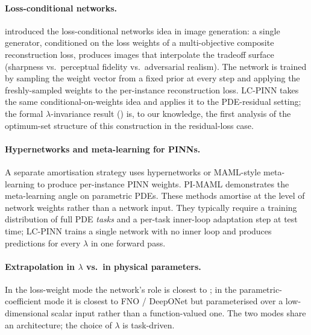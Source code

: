\paragraph{Loss-conditional networks.}
\citet{dosovitskiy2020} introduced the loss-conditional networks idea
in image generation: a single generator, conditioned on the loss
weights of a multi-objective composite reconstruction loss, produces
images that interpolate the tradeoff surface (sharpness vs.\ perceptual
fidelity vs.\ adversarial realism). The network is trained by sampling
the weight vector from a fixed prior at every step and applying the
freshly-sampled weights to the per-instance reconstruction loss.
LC-PINN takes the same conditional-on-weights idea and applies it to
the PDE-residual setting; the formal $\lambda$-invariance result
() is, to our knowledge, the first analysis of the
optimum-set structure of this construction in the residual-loss
case.

\paragraph{Hypernetworks and meta-learning for PINNs.}
A separate amortisation strategy uses hypernetworks
\citep{ha2017hypernetworks} or MAML-style meta-learning
\citep{finn2017maml} to produce per-instance PINN weights. PI-MAML
\citep{liu2022pi-maml} demonstrates the meta-learning angle on
parametric PDEs. These methods amortise at the level of network
weights rather than a network input. They typically require a training
distribution of full PDE \emph{tasks} and a per-task inner-loop
adaptation step at test time; LC-PINN trains a single network with no
inner loop and produces predictions for every $\lambda$ in one forward
pass.

\paragraph{Extrapolation in $\lambda$ vs.\ in physical parameters.}
In the loss-weight mode the network's role is closest to
\citet{dosovitskiy2020}; in the parametric-coefficient mode it is
closest to FNO / DeepONet but parameterised over a low-dimensional
scalar input rather than a function-valued one. The two modes share
an architecture; the choice of $\lambda$ is task-driven.
